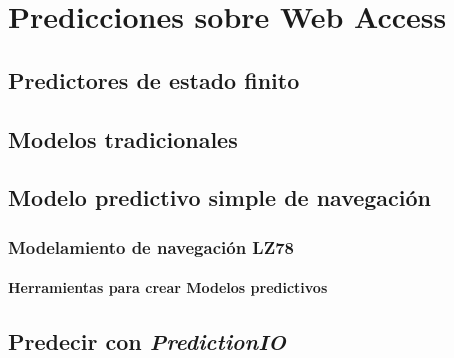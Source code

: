 \chapter[Predicciones sobre Web Access]{Predicciones sobre Web Access}\label{ch:predicciones-webaccess}




 




\section{Predictores de estado finito}
	

\section{Modelos tradicionales}
	


\section{Modelo predictivo simple de navegación }
	
	
	\subsection{Modelamiento de navegación LZ78}
		




\subsubsection{Herramientas para crear Modelos predictivos}

\section{Predecir con \emph{PredictionIO}}



